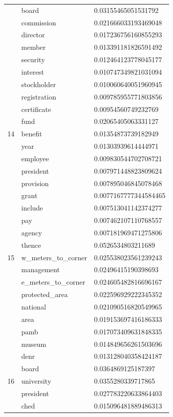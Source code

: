 \documentclass[conference]{IEEEtran}
\begin{document}
\begin{center}
\begin{longtable}{|l|l|l|}
& board & 0.03155465051531792 \\
& commission & 0.021666033193469048 \\
& director & 0.017236756160855293 \\
& member & 0.013391181826591492 \\
& security & 0.012464123778045177 \\
& interest & 0.010747349821031094 \\
& stockholder & 0.010060640051960945 \\
& registration & 0.009785955771803856 \\
& certificate & 0.00954560749232769 \\
\hline
\multirow{3}{4em}{14} & fund & 0.02065405063331127 \\
& benefit & 0.01354873739182949 \\
& year & 0.01303939614444971 \\
& employee & 0.009830544702708721 \\
& president & 0.007971448823809624 \\
& provision & 0.007895046845078468 \\
& grant & 0.0077167777344584465 \\
& include & 0.007513041142374277 \\
& pay & 0.007462107110768557 \\
& agency & 0.007181969471275806 \\
\hline
\multirow{3}{4em}{15} & thence & 0.0526534803211689 \\
& w\_meters\_to\_corner & 0.025538023561239243 \\
& management & 0.02496415190398693 \\
& e\_meters\_to\_corner & 0.024605482816696167 \\
& protected\_area & 0.022596929222345352 \\
& national & 0.021090516820549965 \\
& area & 0.019153697416186333 \\
& pamb & 0.017073409631848335 \\
& museum & 0.014849656261503696 \\
& denr & 0.013128040358424187 \\
\hline
\multirow{3}{4em}{16} & board & 0.0364869125187397 \\
& university & 0.0355280339717865 \\
& president & 0.027783220633864403 \\
& ched & 0.015096481889486313 \\

\end{longtable}
\end{center}
\end{document}
